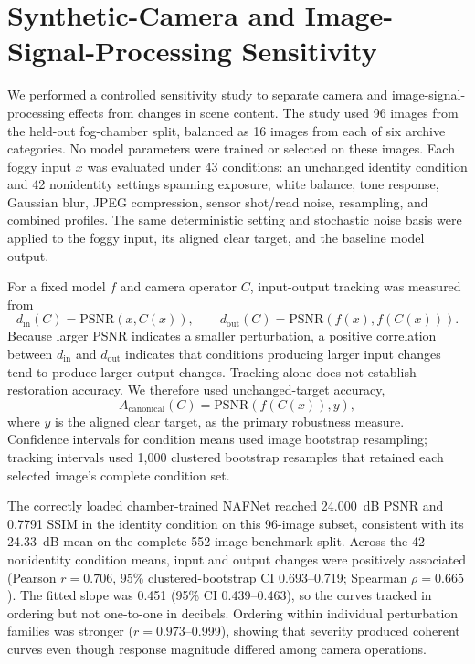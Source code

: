 \documentclass[9pt]{osa-supplemental-document}
\begin{document}
\section{Synthetic-Camera and Image-Signal-Processing Sensitivity}
\label{secS:synthetic_camera}

We performed a controlled sensitivity study to separate camera and
image-signal-processing effects from changes in scene content. The study
used 96 images from the held-out fog-chamber split, balanced as 16 images
from each of six archive categories. No model parameters were trained or
selected on these images. Each foggy input $x$ was evaluated under 43
conditions: an unchanged identity condition and 42 nonidentity settings
spanning exposure, white balance, tone response, Gaussian blur, JPEG
compression, sensor shot/read noise, resampling, and combined profiles.
The same deterministic setting and stochastic noise basis were applied to
the foggy input, its aligned clear target, and the baseline model output.

For a fixed model $f$ and camera operator $C$, input-output tracking was
measured from
\begin{equation}
d_{\mathrm{in}}(C)=\mathrm{PSNR}(x,C(x)), \qquad
d_{\mathrm{out}}(C)=\mathrm{PSNR}(f(x),f(C(x))).
\label{eqS:camera_tracking}
\end{equation}
Because larger PSNR indicates a smaller perturbation, a positive
correlation between $d_{\mathrm{in}}$ and $d_{\mathrm{out}}$ indicates
that conditions producing larger input changes tend to produce larger
output changes. Tracking alone does not establish restoration accuracy.
We therefore used unchanged-target accuracy,
\begin{equation}
A_{\mathrm{canonical}}(C)=\mathrm{PSNR}(f(C(x)),y),
\label{eqS:camera_accuracy}
\end{equation}
where $y$ is the aligned clear target, as the primary robustness measure.
Confidence intervals for condition means used image bootstrap resampling;
tracking intervals used 1{,}000 clustered bootstrap resamples that retained
each selected image's complete condition set.

The correctly loaded chamber-trained NAFNet reached 24.000~dB PSNR and
0.7791 SSIM in the identity condition on this 96-image subset, consistent
with its 24.33~dB mean on the complete 552-image benchmark split. Across
the 42 nonidentity condition means, input and output changes were
positively associated (Pearson $r=0.706$, 95\% clustered-bootstrap CI
0.693--0.719; Spearman $\rho=0.665$). The fitted slope was 0.451 (95\%
CI 0.439--0.463), so the curves tracked in ordering but not one-to-one in
decibels. Ordering within individual perturbation families was stronger
($r=0.973$--0.999), showing that severity produced coherent curves even
though response magnitude differed among camera operations.
\end{document}
